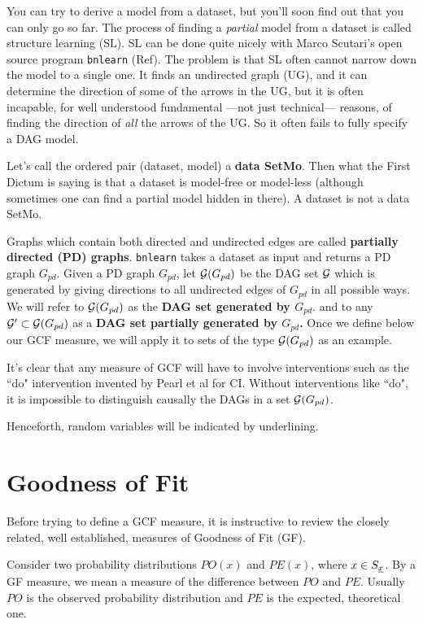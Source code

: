 You can try to derive a model from a dataset, 
but you'll soon find out that you can only go so far.
The process of finding a {\it partial} model from a dataset 
is called structure learning (SL).  SL can be done quite
 nicely with Marco Scutari's open source program 
{\tt bnlearn} (Ref\cite{bnlearn}).
The problem is that SL often cannot 
narrow down the model to a single one. It finds an undirected graph (UG), 
and it can determine the direction of some of the arrows in the UG, 
but it is often incapable, for well understood 
fundamental ---not just technical--- reasons,
 of finding the direction of {\it all}  the arrows of the UG. 
So it often fails to fully specify a DAG model.

Let's call the ordered pair (dataset, model) a 
{\bf data SetMo}.
 Then what the First Dictum is saying is that a dataset 
is model-free or model-less (although sometimes one can 
find a partial model hidden in there). 
A dataset is not a data SetMo.

Graphs
which contain both directed 
and undirected edges
are called 
{\bf partially directed (PD) graphs}.
{\tt bnlearn} takes
a dataset as input
and returns a PD graph
$G_{pd}$.
Given a PD graph $G_{pd}$,
let ${\cal G}(G_{pd})$
be the DAG set ${\cal G}$
which 
is generated
by giving directions to all 
undirected edges of $G_{pd}$
in all possible ways.
We will refer to 
 ${\cal G}(G_{pd})$ as 
the {\bf DAG set generated by $G_{pd}$}.
and to any ${\cal G}'\subset 
{\cal G}(G_{pd})$ as a {\bf DAG set partially 
generated by $G_{pd}$.}
Once we define below our
 GCF measure,
we will apply it to
sets of the type ${\cal G}(G_{pd})$
as an example.


It's clear that any measure
of GCF will have to
involve interventions
such as the ``do" intervention
invented by Pearl et al 
for CI.
Without interventions like ``do",
it is impossible
to distinguish causally the
DAGs in a set ${\cal G}(G_{pd})$.

Henceforth, random variables
will be indicated by underlining.

\section{Goodness of Fit}
Before trying to
define a GCF measure,
it
is instructive to review 
the closely related, well established, measures
of Goodness of Fit (GF). 



Consider 
two
probability distributions
$PO(x)$ and $PE(x)$,
where $x\in S_{\underline{x}}$.
By a GF measure, we mean 
a measure of the 
difference between 
$PO$ and $PE$.
Usually $PO$ is the
observed probability distribution and 
$PE$ is the expected, theoretical one.


